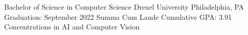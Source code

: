 

\begin{cventries}

  \cventry
    {Bachelor of Science in Computer Science} %
    {Drexel University} %
    {Philadelphia, PA} %
    {Graduation: September 2022} %
    {}
  \vspace*{-.4cm}\cventry
    {Summa Cum Laude}
    {}
    {}
    {Cumulative GPA: 3.91}
    {Concentrations in AI and Computer Vision}

\end{cventries}
